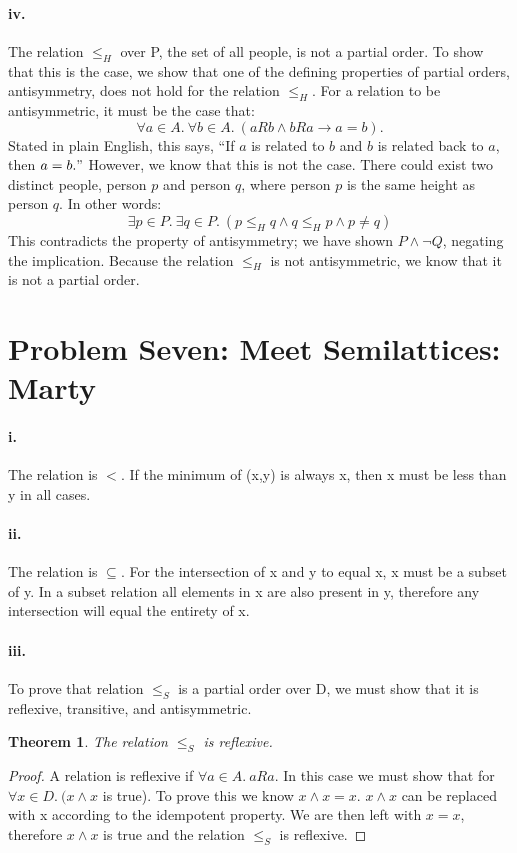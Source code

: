\documentclass[10pt,letter]{article}
\newtheorem*{thm}{Theorem}
\begin{document}
\paragraph{iv.} The relation $\leq_H$ over P, the set of all people, is not a partial order. To show that this is the case, we show that one of the defining properties of partial orders, antisymmetry, does not hold for the relation $\leq_H$. For a relation to be antisymmetric, it must be the case that:
$$\forall a \in A.\ \forall b \in A.\ (aRb \wedge bRa \rightarrow a=b).$$
Stated in plain English, this says, ``If $a$ is related to $b$ and $b$ is related back to $a$, then $a = b."$ However, we know that this is not the case. There could exist two distinct people, person $p$ and person $q$, where person $p$ is the same height as person $q$. In other words:
$$\exists p \in P.\ \exists q \in P.\ (p \leq_H q \wedge q \leq_H p \wedge p \neq q)$$
This contradicts the property of antisymmetry; we have shown $P \wedge \neg Q$, negating the implication. Because the relation $\leq_H$ is not antisymmetric, we know that it is not a partial order.

\section*{Problem Seven: Meet Semilattices: Marty}

\paragraph{i.} The relation is $<$. If the minimum of (x,y) is always x, then x must be less than y in all cases. 
\paragraph{ii.} The relation is $\subseteq$. For the intersection of x and y to equal x, x must be a subset of y. In a subset relation all elements in x are also present in y, therefore any intersection will equal the entirety of x. 
\paragraph{iii.} 
To prove that relation $\le_S$ is a partial order over D, we must show that it is reflexive, transitive, and antisymmetric.\\
 
\begin{thm} The relation $\le_S$ is reflexive. \end{thm}
\begin{proof} 
A relation is reflexive if  $\forall a \in A. \> aRa.$  In this case we must show that for $\forall x \in D. \ (x \wedge x$ is true). To prove this we know $x \wedge x = x$. $x \wedge x$ can be replaced with x according to the idempotent property. We are then left with $x = x$, therefore $x \wedge x$ is true and the relation $\le_S$ is reflexive.
\end{proof}
\end{document}
